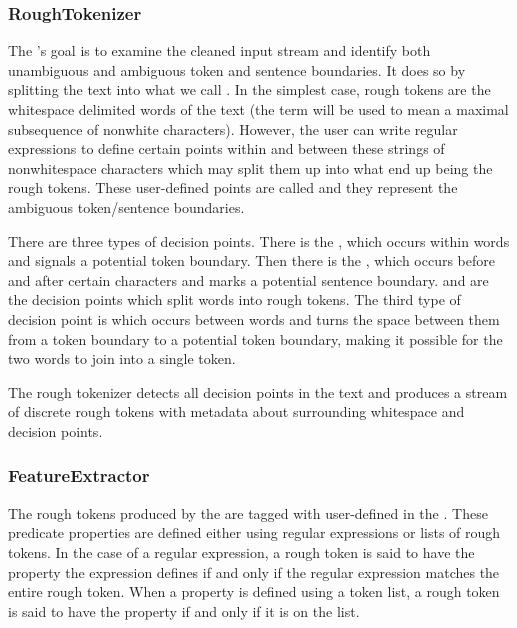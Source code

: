 \subsubsection{RoughTokenizer}
\label{ssec:impl-overview-roughtokenizer}

The 's goal is to examine the cleaned input stream and
identify both unambiguous and ambiguous token and sentence boundaries. It does
so by splitting the text into what we call . In the
simplest case, rough tokens are the whitespace delimited words of the text (the
term  will be used to mean a maximal subsequence of nonwhite
characters). However, the user can write regular expressions to define certain
points within and between these strings of nonwhitespace characters which may
split them up into what end up being the rough tokens. These user-defined
points are called  and they represent the ambiguous
token/sentence boundaries.

There are three types of decision points. There is the \maysplit{}, which occurs
within words and signals a potential token boundary. Then there is the
\maybreaksentence{}, which occurs before and after certain characters and marks
a potential sentence boundary. \maysplit{} and \maybreaksentence{} are the
decision points which split words into rough tokens. The third type of decision
point is \mayjoin{} which occurs between words and turns the space between them
from a token boundary to a potential token boundary, making it possible for the
two words to join into a single token.

The rough tokenizer detects all decision points in the text and produces a
stream of discrete rough tokens with metadata about surrounding whitespace and
decision points.

\subsubsection{FeatureExtractor}
\label{ssec:impl-overview-featureextractor}

The rough tokens produced by the  are tagged with
user-defined  in the . These
predicate properties are defined either using regular expressions or lists of
rough tokens. In the case of a regular expression, a rough token is said to
have the property the expression defines if and only if the regular expression
matches the entire rough token. When a property is defined using a token list,
a rough token is said to have the property if and only if it is on the list.


